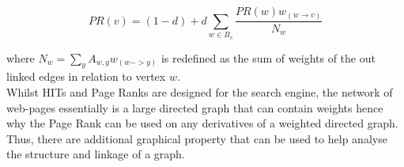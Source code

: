 \begin{equation} \label{eq:wpr}
PR(v) = (1-d) + d\sum_{w \in B_v}\frac{PR(w)w_{(w \rightarrow v)}}{N_w}
\end{equation}

where $N_w = \sum_y{A_{w,y}w_(w -> y)}$ is redefined as the sum of weights of the out linked edges in relation to vertex $w$.
\\

Whilst HITs and Page Ranks are designed for the search engine, the network of web-pages essentially is a large directed graph that can contain weights hence why the Page Rank can be used on any derivatives of a weighted directed graph. Thus, there are additional graphical property that can be used to help analyse the structure and linkage of a graph. 
